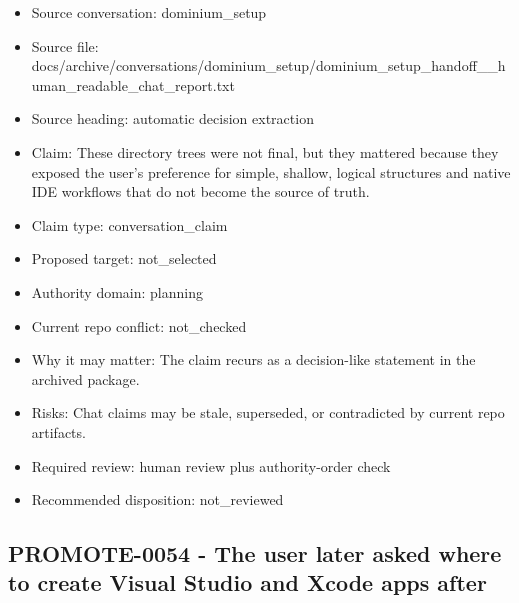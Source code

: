 \documentclass[11pt,a4paper]{report}
\begin{document}
\begin{itemize}
\item Source conversation: dominium\_setup
\item Source file: docs/archive/conversations/dominium\_setup/dominium\_setup\_handoff\_\_human\_readable\_chat\_report.txt
\item Source heading: automatic decision extraction
\item Claim: These directory trees were not final, but they mattered because they exposed the user's preference for simple, shallow, logical structures and native IDE workflows that do not become the source of truth.
\item Claim type: conversation\_claim
\item Proposed target: not\_selected
\item Authority domain: planning
\item Current repo conflict: not\_checked
\item Why it may matter: The claim recurs as a decision-like statement in the archived package.
\item Risks: Chat claims may be stale, superseded, or contradicted by current repo artifacts.
\item Required review: human review plus authority-order check
\item Recommended disposition: not\_reviewed
\end{itemize}

\subsection{PROMOTE-0054 - The user later asked where to create Visual Studio and Xcode apps after}
\end{document}
